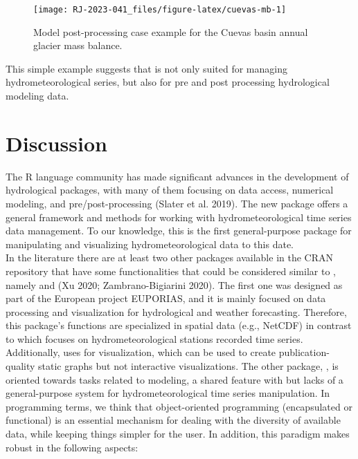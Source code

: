 \begin{figure}

{\centering \texttt{[image: RJ-2023-041\_files/figure-latex/cuevas-mb-1]} 

}

\caption{Model post-processing case example for the Cuevas basin annual glacier mass balance.}\label{fig:cuevas-mb}
\end{figure}

\noindent
This simple example suggests that  is not only
suited for managing hydrometeorological series, but also for pre
and post processing hydrological modeling data.

\hypertarget{discussion}{%
\section{Discussion}\label{discussion}}

The R language community has made significant advances in the development
of hydrological packages, with many of them focusing on data access,
numerical modeling, and pre/post-processing (Slater et al. 2019). The new
 package offers a general framework and methods for working with
hydrometeorological time series data management. To our knowledge, this
is the first general-purpose package for manipulating and visualizing
hydrometeorological data to this date.\\
In the literature there are at least two other packages available in the
CRAN repository that have some functionalities that could be considered
similar to , namely  and 
(Xu 2020; Zambrano-Bigiarini 2020). The first one was designed
as part of the European project EUPORIAS, and it is mainly focused
on data processing and visualization for hydrological and weather forecasting.
Therefore, this package's functions are specialized in spatial data
(e.g., NetCDF) in contrast to  which focuses on
hydrometeorological stations recorded time series.
Additionally,  uses  for visualization, which
can be used to create publication-quality static graphs but not interactive
visualizations. The other package, , is oriented towards tasks
related to modeling, a shared feature with  but lacks
of a general-purpose system for hydrometeorological time series manipulation.
In programming terms, we think that object-oriented programming
(encapsulated or functional) is an essential mechanism for dealing with the
diversity of available data, while keeping things simpler for the user.
In addition, this paradigm makes  robust in the following
aspects:

